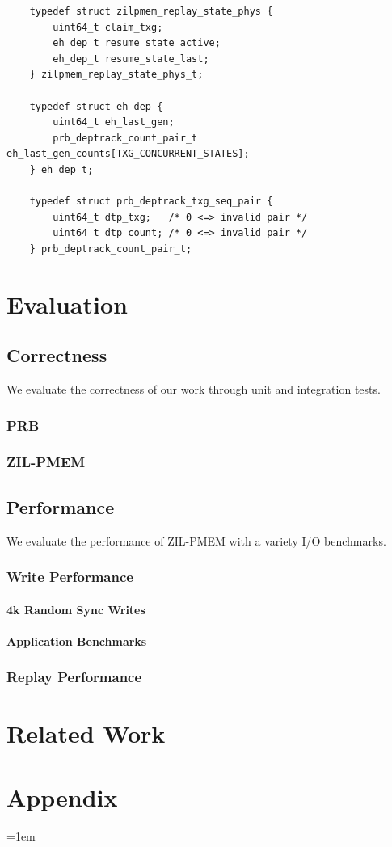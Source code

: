 \documentclass[12pt,a4paper,twoside]{book}
\begin{document}
\begin{lstlisting}
    typedef struct zilpmem_replay_state_phys {
        uint64_t claim_txg;
        eh_dep_t resume_state_active;
        eh_dep_t resume_state_last;
    } zilpmem_replay_state_phys_t;
    
    typedef struct eh_dep {
        uint64_t eh_last_gen;
        prb_deptrack_count_pair_t eh_last_gen_counts[TXG_CONCURRENT_STATES];
    } eh_dep_t;
    
    typedef struct prb_deptrack_txg_seq_pair {
        uint64_t dtp_txg;	/* 0 <=> invalid pair */
        uint64_t dtp_count;	/* 0 <=> invalid pair */
    } prb_deptrack_count_pair_t;
    \end{lstlisting}
    

\chapter{Evaluation}\label{ch:eval}
\section{Correctness}
We evaluate the correctness of our work through unit and integration tests.
\subsection{PRB}
\subsection{ZIL-PMEM}
\section{Performance}
We evaluate the performance of ZIL-PMEM with a variety I/O benchmarks.
\subsection{Write Performance}
\subsubsection{4k Random Sync Writes}
\subsubsection{Application Benchmarks}
\subsection{Replay Performance}

\chapter{Related Work}

\backmatter

\chapter{Appendix}\label{ch:appendix}

\cleardoublepage
{}
{}
\emergencystretch=1em
\printbibliography
\end{document}
